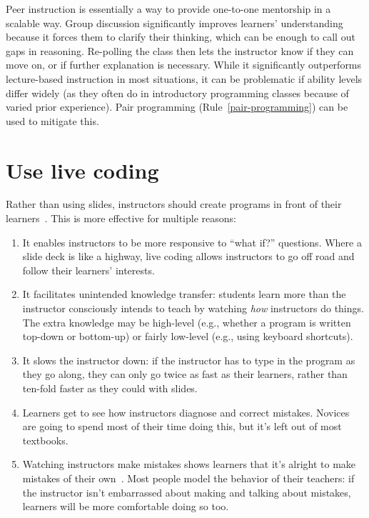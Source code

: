 \documentclass[10pt,letterpaper]{article}
\newcommand{\rulemajor}[2]{\section{#1}\label{#2}}
\newcommand{\ruleref}[1]{Rule~\ref{#1}}
\begin{document}
Peer instruction is essentially
a way to provide one-to-one mentorship in a scalable way.
Group discussion significantly improves learners' understanding
because it forces them to clarify their thinking,
which can be enough to call out gaps in reasoning.
Re-polling the class then lets the instructor know if they can move on,
or if further explanation is necessary.
While it significantly outperforms lecture-based instruction in most situations,
it can be problematic if ability levels differ widely
(as they often do in introductory programming classes
because of varied prior experience).
Pair programming (\ruleref{pair-programming}) can be used to mitigate this.

\rulemajor{Use live coding}{live-coding}

Rather than using slides,
instructors should create programs in front of their learners~\cite{rubin-live-coding}.
This is more effective for multiple reasons:

\begin{enumerate}

\item It enables instructors to be more responsive to ``what if?''
  questions. Where a slide deck is like a highway, live coding
  allows instructors to go off road and follow their learners'
  interests.

\item It facilitates unintended knowledge transfer: students learn
  more than the instructor consciously intends to teach by watching
  \textit{how} instructors do things.  The extra knowledge may be
  high-level (e.g., whether a program is written top-down or
  bottom-up) or fairly low-level (e.g., using keyboard shortcuts).

\item It slows the instructor down: if the instructor has to type in
  the program as they go along, they can only go twice as fast as
  their learners, rather than ten-fold faster as they could with
  slides.

\item Learners get to see how instructors diagnose and correct
  mistakes. Novices are going to spend most of their time doing
  this, but it's left out of most textbooks.

\item Watching instructors make mistakes shows learners that it's
  alright to make mistakes of their own~\cite{barker-live-coding}.
  Most people model the behavior of their teachers: if the instructor
  isn't embarrassed about making and talking about mistakes, learners
  will be more comfortable doing so too.

\end{enumerate}
\end{document}
